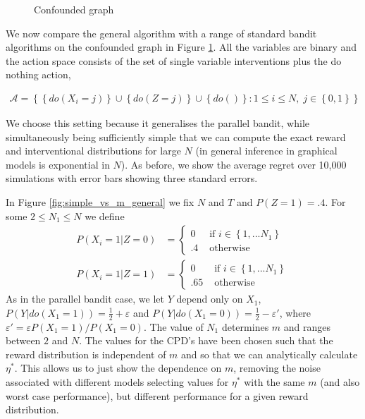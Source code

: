 \documentclass[11pt,a4paper,twoside]{report}
\newcommand{\calA}{\mathcal A}
\newcommand{\set}[1]{\left\{#1\right\}}
\newcommand{\eq}[1]{\begin{align*}#1\end{align*}}
\theoremstyle{plain}
\theoremstyle{definition}
\let\epsilon\varepsilon
\begin{document}
\begin{figure}[H]
	\centering    
        \caption{Confounded graph}
        \label{fig:parallel_confounded} 
\end{figure}


We now compare the general algorithm with a range of standard bandit algorithms on the confounded graph in Figure \ref{fig:parallel_confounded}. All the variables are binary and the action space consists of the set of single variable interventions plus the do nothing action, 

\eq{
\calA = \set{\set{do(X_i = j)} \cup \set{do(Z = j)} \cup \set{do()}: 1\leq i \leq N,\; j \in \set{0,1}}
} 

We choose this setting because it generalises the parallel bandit, while simultaneously being sufficiently simple that we can compute the exact reward and interventional distributions for large $N$ (in general inference in graphical models is exponential in $N$). As before, we show the average regret over 10,000 simulations with error bars showing three standard errors. 

In Figure \ref{fig:simple_vs_m_general} we fix $N$ and $T$ and $P(Z=1) = .4$. For some $2 \leq N_1 \leq N$ we define 
\eq{
P(X_i = 1|Z = 0) &= \begin{cases} 0 & \text{ if } i \in \set{1,...N_1} \\ .4 & \text{ otherwise } \end{cases}\\
P(X_i = 1|Z = 1) &= \begin{cases} 0 & \text{ if } i \in \set{1,...N_1} \\ .65 & \text{ otherwise } \end{cases}
}
As in the parallel bandit case, we let $Y$ depend only on $X_1$, $P(Y|do(X_1=1)) = \frac{1}{2} + \epsilon$ and $P(Y|do(X_1=0)) = \frac{1}{2}-\epsilon'$, where $\epsilon' = \epsilon P(X_1=1) / P(X_1=0)$. The value of $N_1$ determines $m$ and ranges between $2$ and $N$. The values for the CPD's have been chosen such that the reward distribution is independent of $m$ and so that we can analytically calculate $\eta^*$. This allows us to just show the dependence on $m$, removing the noise associated with different models selecting values for $\eta^*$ with the same $m$ (and also worst case performance), but different performance for a given reward distribution. 
\end{document}
